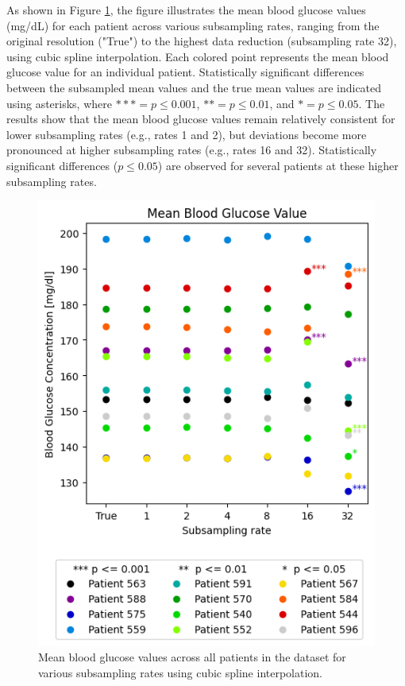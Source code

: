 As shown in Figure \ref{fig:patients_mean}, the figure illustrates the mean blood glucose values (mg/dL) for each patient across various subsampling rates, ranging from the original resolution ("True") to the highest data reduction (subsampling rate 32), using cubic spline interpolation. Each colored point represents the mean blood glucose value for an individual patient. Statistically significant differences between the subsampled mean values and the true mean values are indicated using asterisks, where $\ast \ast \ast = p \le 0.001$, $\ast \ast  = p \le 0.01$, and $\ast = p \le 0.05$.
The results show that the mean blood glucose values remain relatively consistent for lower subsampling rates (e.g., rates 1 and 2), but deviations become more pronounced at higher subsampling rates (e.g., rates 16 and 32). Statistically significant differences ($p \le 0.05$) are observed for several patients at these higher subsampling rates. 
\begin{figure}[h!] %
	\centering
	\includegraphics[width=\linewidth]{Figures/all_patients_mean_cbg_values.png} %
	\caption{Mean blood glucose values across all patients in the dataset for various subsampling rates using cubic spline interpolation.}
	\label{fig:patients_mean}  %
\end{figure}

